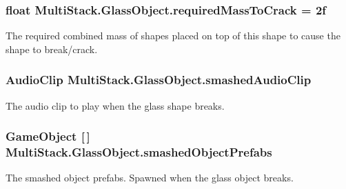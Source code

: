 \hypertarget{class_multi_stack_1_1_glass_object_ac93340a7501f7e1db6dcffef8dea24ea}{}
\subsubsection[{required\+Mass\+To\+Crack}]{\setlength{\rightskip}{0pt plus 5cm}float Multi\+Stack.\+Glass\+Object.\+required\+Mass\+To\+Crack = 2f}\label{class_multi_stack_1_1_glass_object_ac93340a7501f7e1db6dcffef8dea24ea}


The required combined mass of shapes placed on top of this shape to cause the shape to break/crack. 

\hypertarget{class_multi_stack_1_1_glass_object_a0ffbf8da1d39767934eb87e8a2ee6710}{}
\subsubsection[{smashed\+Audio\+Clip}]{\setlength{\rightskip}{0pt plus 5cm}Audio\+Clip Multi\+Stack.\+Glass\+Object.\+smashed\+Audio\+Clip}\label{class_multi_stack_1_1_glass_object_a0ffbf8da1d39767934eb87e8a2ee6710}


The audio clip to play when the glass shape breaks. 

\hypertarget{class_multi_stack_1_1_glass_object_af62687ae4ee9848946633a1fb5e0a4ff}{}
\subsubsection[{smashed\+Object\+Prefabs}]{\setlength{\rightskip}{0pt plus 5cm}Game\+Object \mbox{[}$\,$\mbox{]} Multi\+Stack.\+Glass\+Object.\+smashed\+Object\+Prefabs}\label{class_multi_stack_1_1_glass_object_af62687ae4ee9848946633a1fb5e0a4ff}


The smashed object prefabs. Spawned when the glass object breaks. 



